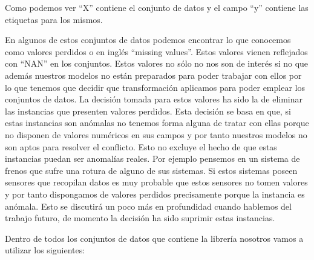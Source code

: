 Como podemos ver ``X'' contiene el conjunto de datos y el campo ``y'' contiene las etiquetas para los mismos.

En algunos de estos conjuntos de datos podemos encontrar lo que conocemos como valores perdidos o en inglés ``missing values''. Estos valores vienen reflejados con ``NAN'' en los conjuntos. Estos valores no sólo no nos son de interés si no que además nuestros modelos no están preparados para poder trabajar con ellos por lo que tenemos que decidir que transformación aplicamos para poder emplear los conjuntos de datos. La decisión tomada para estos valores ha sido la de eliminar las instancias que presenten valores perdidos. Esta decisión se basa en que, si estas instancias son anómalas no tenemos forma alguna de tratar con ellas porque no disponen de valores numéricos en sus campos y por tanto nuestros modelos no son aptos para resolver el conflicto. Esto no excluye el hecho de que estas instancias puedan ser anomalías reales. Por ejemplo pensemos en un sistema de frenos que sufre una rotura de alguno de sus sistemas. Si estos sistemas poseen sensores que recopilan datos es muy probable que estos sensores no tomen valores y por tanto dispongamos de valores perdidos precisamente porque la instancia es anómala. Esto se discutirá un poco más en profundidad cuando hablemos del trabajo futuro, de momento la decisión ha sido suprimir estas instancias.

Dentro de todos los conjuntos de datos que contiene la librería nosotros vamos a utilizar los siguientes:


